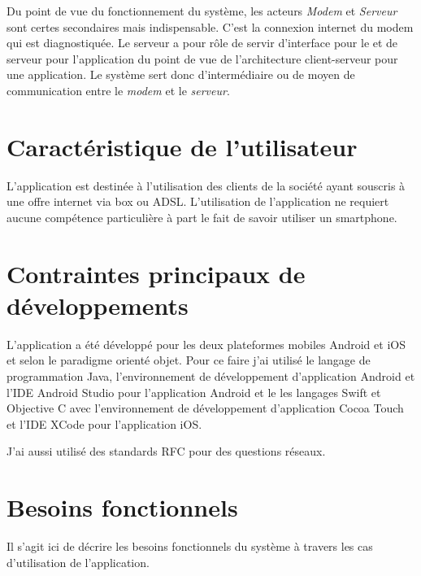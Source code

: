 Du point de vue du fonctionnement du système, les acteurs \emph{Modem} et \emph{Serveur} sont certes secondaires mais indispensable. C'est la connexion internet du modem qui est diagnostiquée. Le serveur a pour rôle de servir d'interface pour le \hd et de serveur pour l'application du point de vue de l'architecture client-serveur pour une application. Le système sert donc d'intermédiaire ou de moyen de communication entre le \emph{modem} et le \emph{serveur}.

\section{Caractéristique de l'utilisateur}
L'application est destinée à l'utilisation des clients de la société \lol ayant souscris à une offre internet via box ou \gls{ADSL}. L'utilisation de l'application ne requiert aucune compétence particulière à part le fait de savoir utiliser un smartphone.

\section{Contraintes principaux de développements}
L'application a été développé pour les deux plateformes mobiles \gls{Android} et \gls{iOS} et selon le paradigme orienté objet. Pour ce faire j'ai utilisé le langage de programmation \gls{Java}, l'environnement de  développement d'application \gls{Android} et l'\gls{IDE} Android Studio pour l'application Android et le les langages \gls{Swift} et \gls{Objective C} avec l'environnement de développement d'application \gls{Cocoa} Touch et l'\gls{IDE} XCode pour l'application \gls{iOS}. 

J'ai aussi utilisé des standards \gls{RFC} pour des questions réseaux.

\section{Besoins fonctionnels}
Il s'agit ici de décrire les besoins fonctionnels du système à travers les cas d'utilisation de l'application.
